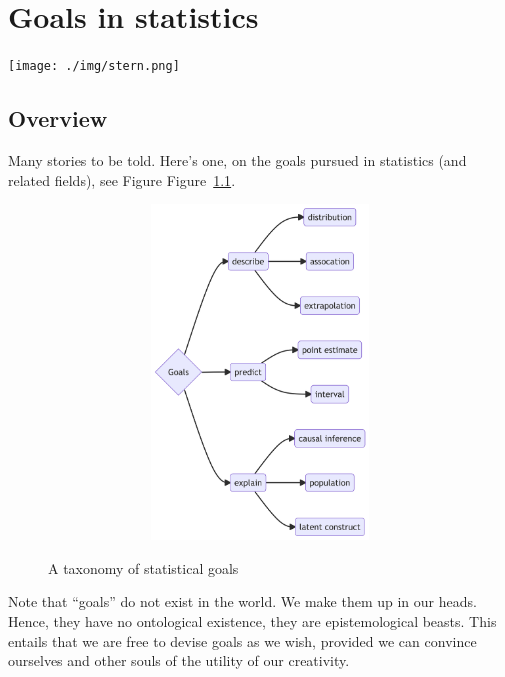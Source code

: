 \documentclass[
  letterpaper,
  DIV=11,
  numbers=noendperiod]{scrreprt}
\theoremstyle{definition}
\theoremstyle{definition}
\theoremstyle{remark}
\begin{document}

\hypertarget{goals-in-statistics}{%
\chapter{Goals in statistics}\label{goals-in-statistics}}

\texttt{[image: ./img/stern.png]}

\hypertarget{overview}{%
\section{Overview}\label{overview}}

Many stories to be told. Here's one, on the goals pursued in statistics
(and related fields), see Figure Figure~\ref{fig-goals}.

\begin{figure}

{\centering 

\begin{figure}[H]

{\centering \includegraphics[width=5.5in,height=3.5in]{./goals_files/figure-latex/mermaid-figure-1.png}

}

\end{figure}

}

\caption{\label{fig-goals}A taxonomy of statistical goals}

\end{figure}

\begin{tcolorbox}[enhanced jigsaw, bottomtitle=1mm, opacitybacktitle=0.6, arc=.35mm, colframe=quarto-callout-note-color-frame, left=2mm, bottomrule=.15mm, coltitle=black, toptitle=1mm, breakable, opacityback=0, colbacktitle=quarto-callout-note-color!10!white, titlerule=0mm, title=\textcolor{quarto-callout-note-color}{\faInfo}\hspace{0.5em}{Note}, leftrule=.75mm, toprule=.15mm, colback=white, rightrule=.15mm]
Note that ``goals'' do not exist in the world. We make them up in our
heads. Hence, they have no ontological existence, they are
epistemological beasts. This entails that we are free to devise goals as
we wish, provided we can convince ourselves and other souls of the
utility of our creativity.
\end{tcolorbox}
\end{document}
